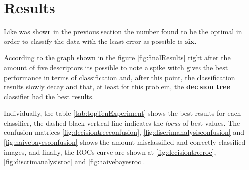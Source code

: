 \documentclass[conference]{IEEEtran}
\begin{document}
	\section{Results}
		\par Like was shown in the previous section the number found to be the optimal in order to classify the data with the least error as possible is \textbf{six}.
	
		\par According to the graph shown in the figure \ref{fig:finalResults} right after the amount of five descriptors its possible to note a spike witch gives the best performance in terms of classification and, after this point, the classification results slowly decay and that, at least for this problem, the \textbf{decision tree} classifier had the best results.
	
		\par Individually, the table \ref{tab:topTenExperiment} shows the best results for each classifier, the dashed black vertical line indicates the \textit{locus} of best values. The confusion matrices \ref{fig:decisiontreeconfusion}, \ref{fig:discrimanalysisconfusion} and \ref{fig:naivebayesconfusion} shows the amount misclassified and correctly classified images, and finally, the ROCs curve are shown at \ref{fig:decisiontreeroc}, \ref{fig:discrimanalysisroc} and \ref{fig:naivebayesroc}.
	
\end{document}
